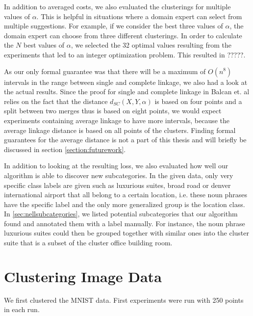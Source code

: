 In addition to averaged costs, we also evaluated the clusterings for multiple values of $\alpha$. This is helpful in situations where a domain expert can select from multiple suggestions. For example, if we consider the best three values of $\alpha$, the domain expert can choose from three different clusterings. In order to calculate the $N$ best values of $\alpha$, we selected the 32 optimal values resulting from the experiments that led to an integer optimization problem. This resulted in ?????.

As our only formal guarantee was that there will be a maximum of $O(n^8)$ intervals in the range between single and complete linkage, we also had a look at the actual results. Since the proof for single and complete linkage in Balcan et. al \cite{DBLP:journals/corr/BalcanNVW16} relies on the fact that the distance $d_{SC}(X,Y,\alpha)$ is based on four points and a split between two merges thus is based on eight points, we would expect experiments containing average linkage to have more intervals, because the average linkage distance is based on all points of the clusters. Finding formal guarantees for the average distance is not a part of this thesis and will briefly be discussed in section \ref{section:futurework}.

In addition to looking at the resulting loss, we also evaluated how well our algorithm is able to discover new subcategories. In the given data, only very specific class labels are given such as luxurious suites, broad road or denver international airport that all belong to a certain location, i.e. these noun phrases have the specific label and the only more generalized group is the location class. In \ref{sec:nellsubcategories}, we listed potential subcategories that our algorithm found and annotated them with a label manually. For instance, the noun phrase luxurious suites could then be grouped together with similar ones into the cluster suite that is a subset of the cluster office building room.

\section{Clustering Image Data}

We first clustered the MNIST data. First experiments were run with 250 points in each run.

